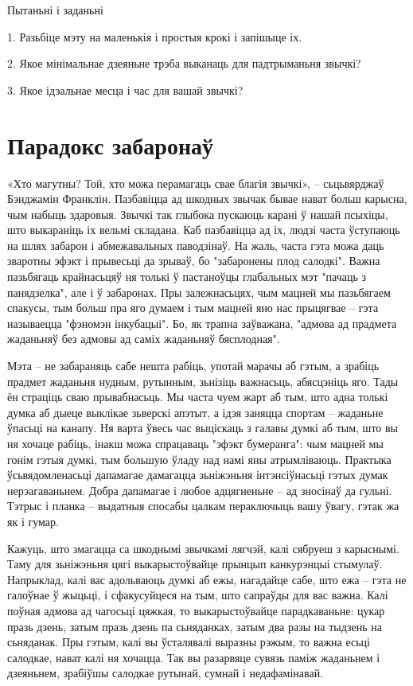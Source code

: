 Пытаньні і заданьні

1. Разьбіце мэту на маленькія і простыя крокі і запішыце іх.

2. Якое мінімальнае дзеяньне трэба выканаць для падтрыманьня звычкі?

3. Якое ідэальнае месца і час для вашай звычкі?


\section{Парадокс забаронаў}

«Хто магутны? Той, хто можа перамагаць свае благія звычкі», – сьцьвярджаў Бэнджамін Франклін. Пазбавіцца ад шкодных звычак бывае нават больш карысна, чым набыць здаровыя. Звычкі так глыбока пускаюць карані ў нашай псыхіцы, што выкараніць іх вельмі складана. Каб пазбавіцца ад іх, людзі часта ўступаюць на шлях забарон і абмежавальных паводзінаў. На жаль, часта гэта можа даць зваротны эфэкт і прывесьці да зрываў, бо "забаронены плод салодкі". Важна пазьбягаць крайнасьцяў ня толькі ў пастаноўцы глабальных мэт "пачаць з панядзелка", але і ў забаронах. Пры залежнасьцях, чым мацней мы пазьбягаем спакусы, тым больш пра яго думаем і тым мацней яно нас прыцягвае – гэта называецца "фэномэн інкубацыі". Бо, як трапна заўважана, "адмова ад прадмета жаданьняў без адмовы ад саміх жаданьняў бясплодная". 

Мэта – не забараняць сабе нешта рабіць, употай марачы аб гэтым, а зрабіць прадмет жаданьня нудным, рутынным, зьнізіць важнасьць, абясцэніць яго. Тады ён страціць сваю прывабнасьць. Мы часта чуем жарт аб тым, што адна толькі думка аб дыеце выклікае зьверскі апэтыт, а ідэя заняцца спортам – жаданьне ўпасьці на канапу. Ня варта ўвесь час выціскаць з галавы думкі аб тым, што вы ня хочаце рабіць, інакш можа спрацаваць "эфэкт бумеранга": чым мацней мы гонім гэтыя думкі, тым большую ўладу над намі яны атрымліваюць. Практыка ўсьвядомленасьці дапамагае дамагацца зьніжэньня інтэнсіўнасьці гэтых думак нерэагаваньнем. Добра дапамагае і любое адцягненьне – ад зносінаў да гульні. Тэтрыс і планка – выдатныя спосабы цалкам пераключыць вашу ўвагу, гэтак жа як і гумар.

Кажуць, што змагацца са шкоднымі звычкамі лягчэй, калі сябруеш з карыснымі. Таму для зьніжэньня цягі выкарыстоўвайце прынцып канкурэнцыі стымулаў. Напрыклад, калі вас адольваюць думкі аб ежы, нагадайце сабе, што ежа – гэта не галоўнае ў жыцьці, і сфакусуйцеся на тым, што сапраўды для вас важна. Калі поўная адмова ад чагосьці цяжкая, то выкарыстоўвайце парадкаваньне: цукар празь дзень, затым празь дзень па сьняданках, затым два разы на тыдзень на сьняданак. Пры гэтым, калі вы ўсталявалі выразны рэжым, то важна есьці салодкае, нават калі ня хочацца. Так вы разарвяце сувязь паміж жаданьнем і дзеяньнем, зрабіўшы салодкае рутынай, сумнай і недафамінавай.

